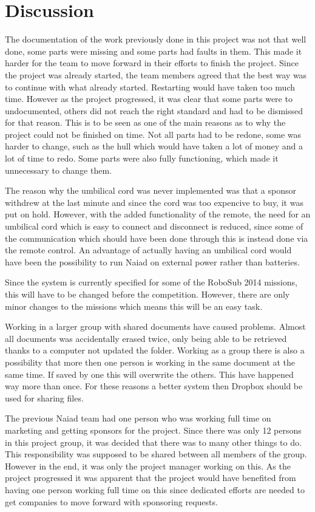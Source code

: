 \section{Discussion}
\noindent
The documentation of the work previously done in this project was not that well done, some parts were missing and some parts had faults in them. This made it harder for the team to move forward in their efforts to finish the project. Since the project was already started, the team members agreed that the best way was to continue with what already started. Restarting would have taken too much time. However as the project progressed, it was clear that some parts were to undocumented, others did not reach the right standard and had to be dismissed for that reason. This is to be seen as one of the main reasons as to why the project could not be finished on time. Not all parts had to be redone, some was harder to change, such as the hull which would have taken a lot of money and a lot of time to redo. Some parts were also fully functioning, which made it unnecessary to change them. 

The reason why the umbilical cord was never implemented was that a sponsor withdrew at the last minute and since the cord was too expencive to buy, it was put on hold. However, with the added functionality of the remote, the need for an umbilical cord which is easy to connect and disconnect is reduced, since some of the communication which should have been done through this is instead done via the remote control. An advantage of actually having an umbilical cord would have been the possibility to run Naiad on external power rather than batteries. 

Since the system is currently specified for some of the RoboSub 2014 missions, this will have to be changed before the competition. However, there are only minor changes to the missions which means this will be an easy task. 

Working in a larger group with shared documents have caused problems. Almost all documents was accidentally erased twice, only being able to be retrieved thanks to a computer not updated the folder. Working as a group there is also a possibility that more then one person is working in the same document at the same time. If saved by one this will overwrite the others. This have happened way more than once. For these reasons a better system then Dropbox should be used for sharing files.

The previous Naiad team had one person who was working full time on marketing and getting sponsors for the project. Since there was only 12 persons in this project group, it was decided that there was to many other things to do. This responsibility was supposed to be shared between all members of the group. However in the end, it was only the project manager working on this. As the project progressed it was apparent that the project would have benefited from having one person working full time on this since dedicated efforts are needed to get companies to move forward with sponsoring requests. 


